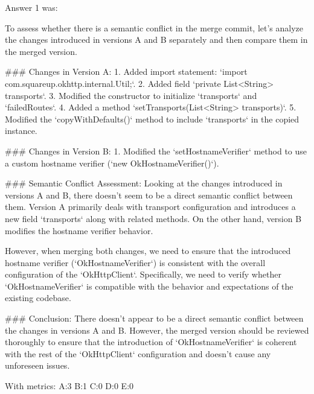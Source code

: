 Answer 1 was:
\begin{spverbatim}
To assess whether there is a semantic conflict in the merge commit, let's analyze the changes introduced in versions A and B separately and then compare them in the merged version.

### Changes in Version A:
1. Added import statement: `import com.squareup.okhttp.internal.Util;`.
2. Added field `private List<String> transports`.
3. Modified the constructor to initialize `transports` and `failedRoutes`.
4. Added a method `setTransports(List<String> transports)`.
5. Modified the `copyWithDefaults()` method to include `transports` in the copied instance.

### Changes in Version B:
1. Modified the `setHostnameVerifier` method to use a custom hostname verifier (`new OkHostnameVerifier()`).

### Semantic Conflict Assessment:
Looking at the changes introduced in versions A and B, there doesn't seem to be a direct semantic conflict between them. Version A primarily deals with transport configuration and introduces a new field `transports` along with related methods. On the other hand, version B modifies the hostname verifier behavior.

However, when merging both changes, we need to ensure that the introduced hostname verifier (`OkHostnameVerifier`) is consistent with the overall configuration of the `OkHttpClient`. Specifically, we need to verify whether `OkHostnameVerifier` is compatible with the behavior and expectations of the existing codebase.

### Conclusion:
There doesn't appear to be a direct semantic conflict between the changes in versions A and B. However, the merged version should be reviewed thoroughly to ensure that the introduction of `OkHostnameVerifier` is coherent with the rest of the `OkHttpClient` configuration and doesn't cause any unforeseen issues.
\end{spverbatim}

With metrics:
A:3
B:1
C:0
D:0
E:0

